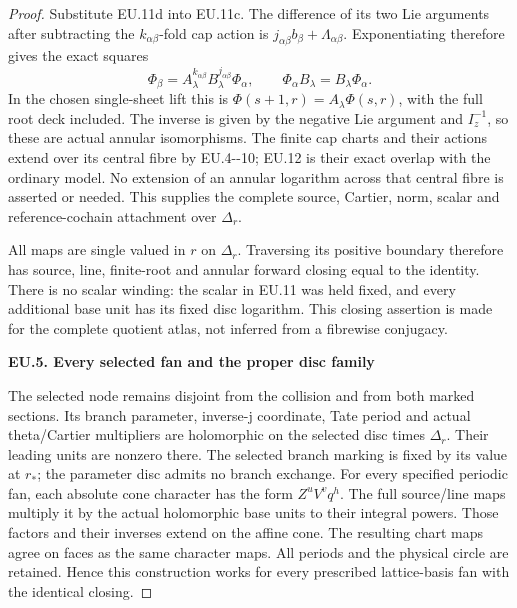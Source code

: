 \begin{proof}
Substitute EU.11d into EU.11c. The difference of its two Lie
arguments after subtracting the \(k_{\alpha\beta}\)-fold cap
action is \(j_{\alpha\beta}b_\beta+\Lambda_{\alpha\beta}\).
Exponentiating therefore gives the exact squares
\[
 \Phi_\beta=A_\lambda^{k_{\alpha\beta}}
                   B_\lambda^{j_{\alpha\beta}}\Phi_\alpha,
 \qquad \Phi_\alpha B_\lambda=B_\lambda\Phi_\alpha.
 \tag{EU.12}
\]
In the chosen single-sheet lift this is
\(\Phi(s+1,r)=A_\lambda\Phi(s,r)\), with the full root deck
included. The inverse is given by the negative Lie argument and
\(I_z^{-1}\), so these are actual annular isomorphisms. The finite
cap charts and their actions extend over its central fibre by
EU.4-\/-10; EU.12 is their exact overlap with the ordinary model.
No extension of an annular logarithm across that central fibre is
asserted or needed. This supplies the complete source, Cartier,
norm, scalar and reference-cochain attachment over \(\Delta_r\).

All maps are single valued in \(r\) on \(\Delta_r\). Traversing
its positive boundary therefore has source, line, finite-root and
annular forward closing equal to the identity. There is no scalar
winding: the scalar in EU.11 was held fixed, and every additional
base unit has its fixed disc logarithm. This closing assertion is
made for the complete quotient atlas, not inferred from a
fibrewise conjugacy.

\par

\medskip\noindent\textbf{EU.5. Every selected fan and the proper disc family}

\par\nobreak

The selected node remains disjoint from the collision and from both
marked sections. Its branch parameter, inverse-j coordinate, Tate
period and actual theta/Cartier multipliers are holomorphic on the
selected disc times \(\Delta_r\). Their leading units are nonzero
there. The selected branch marking is fixed by its value at \(r_*\);
the parameter disc admits no branch exchange. For every specified
periodic fan, each absolute cone character has the form
\(Z^uV^v q^h\). The full source/line maps multiply it by the actual
holomorphic base units to their integral powers. Those factors and
their inverses extend on the affine cone. The resulting chart maps
agree on faces as the same character maps. All periods and the
physical circle are retained. Hence this construction works for
every prescribed lattice-basis fan with the identical closing.


\end{proof}
